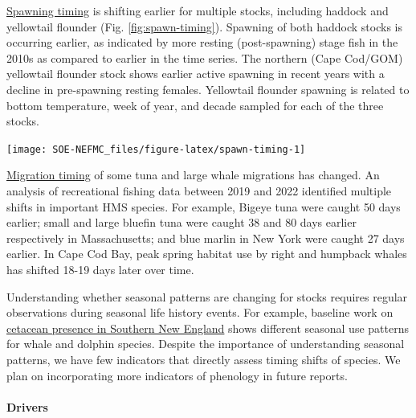 \documentclass[
  10pt,
]{article}
\let\origfigure\figure
\let\endorigfigure\endfigure
\renewenvironment{figure}[1][2] {
    \expandafter\origfigure\expandafter[H]
} {
    \endorigfigure
}
\begin{document}
\href{https://noaa-edab.github.io/catalog/spawn_timing.html}{Spawning timing} is shifting earlier for multiple stocks, including haddock and yellowtail flounder (Fig. \ref{fig:spawn-timing}). Spawning of both haddock stocks is occurring earlier, as indicated by more resting (post-spawning) stage fish in the 2010s as compared to earlier in the time series. The northern (Cape Cod/GOM) yellowtail flounder stock shows earlier active spawning in recent years with a decline in pre-spawning resting females. Yellowtail flounder spawning is related to bottom temperature, week of year, and decade sampled for each of the three stocks.

\begin{figure}

{\centering \texttt{[image: SOE-NEFMC\_files/figure-latex/spawn-timing-1]} 

}

\caption{Percent resting stage (non-spawning) fish from two haddock and three yellowtail flounder stocks: CC = Cape Cod Gulf of Maine, GOM = Gulf of Maine, GB = Georges Bank, SNE = Southern New England.}\label{fig:spawn-timing}
\end{figure}

\href{https://noaa-edab.github.io/catalog/timing_shifts.html}{Migration timing} of some tuna and large whale migrations has changed. An analysis of recreational fishing data between 2019 and 2022 identified multiple shifts in important HMS species. For example, Bigeye tuna were caught 50 days earlier; small and large bluefin tuna were caught 38 and 80 days earlier respectively in Massachusetts; and blue marlin in New York were caught 27 days earlier. In Cape Cod Bay, peak spring habitat use by right and humpback whales has shifted 18-19 days later over time.

Understanding whether seasonal patterns are changing for stocks requires regular observations during seasonal life history events. For example, baseline work on \href{https://noaa-edab.github.io/catalog/cetacean_acoustic.html}{cetacean presence in Southern New England} shows different seasonal use patterns for whale and dolphin species. Despite the importance of understanding seasonal patterns, we have few indicators that directly assess timing shifts of species. We plan on incorporating more indicators of phenology in future reports.

\hypertarget{drivers-1}{%
\paragraph{Drivers}\label{drivers-1}}
\end{document}
